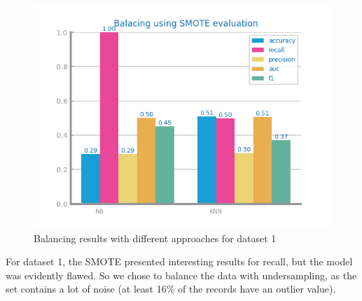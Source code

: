 \documentclass[10pt]{extarticle}
\begin{document}
\begin{figure}[H]
\includegraphics[scale=0.80]{images/dataset1/data_preparation/CovidPos_balancing_SMOTE.png}
\caption{Balancing results with different approaches for dataset 1}
\end{figure}
For dataset 1, the SMOTE presented interesting results for recall, but the model was evidently flawed.
So we chose to balance the data with undersampling, as the set contains a lot of noise 
(at least 16\% of the records have an outlier value).
\end{document}
